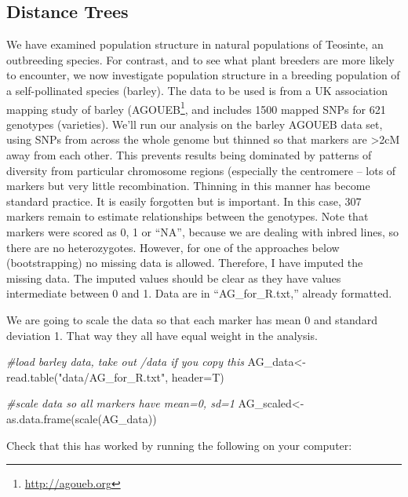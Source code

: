 \documentclass[
]{book}
\newenvironment{Shaded}{\begin{snugshade}}{\end{snugshade}}
\newcommand{\AttributeTok}[1]{\textcolor[rgb]{0.77,0.63,0.00}{#1}}
\newcommand{\CommentTok}[1]{\textcolor[rgb]{0.56,0.35,0.01}{\textit{#1}}}
\newcommand{\FunctionTok}[1]{\textcolor[rgb]{0.00,0.00,0.00}{#1}}
\newcommand{\NormalTok}[1]{#1}
\newcommand{\OtherTok}[1]{\textcolor[rgb]{0.56,0.35,0.01}{#1}}
\newcommand{\StringTok}[1]{\textcolor[rgb]{0.31,0.60,0.02}{#1}}
\renewcommand{\href}[2]{#2\footnote{\url{#1}}}
\begin{document}
\hypertarget{distance-trees}{%
\subsection{Distance Trees}\label{distance-trees}}

We have examined population structure in natural populations of Teosinte, an outbreeding species. For contrast, and to see what plant breeders are more likely to encounter, we now investigate population structure in a breeding population of a self-pollinated species (barley). The data to be used is from a UK association mapping study of barley (\href{http://agoueb.org}{AGOUEB}, and includes 1500 mapped SNPs for 621 genotypes (varieties). We'll run our analysis on the barley AGOUEB data set, using SNPs from across the whole genome but thinned so that markers are \textgreater2cM away from each other. This prevents results being dominated by patterns of diversity from particular chromosome regions (especially the centromere -- lots of markers but very little recombination. Thinning in this manner has become standard practice. It is easily forgotten but is important. In this case, 307 markers remain to estimate relationships between the genotypes. Note that markers were scored as 0, 1 or ``NA'', because we are dealing with inbred lines, so there are no heterozygotes. However, for one of the approaches below (bootstrapping) no missing data is allowed. Therefore, I have imputed the missing data. The imputed values should be clear as they have values intermediate between 0 and 1. Data are in ``AG\_for\_R.txt,'' already formatted.

We are going to scale the data so that each marker has mean 0 and standard deviation 1. That way they all have equal weight in the analysis.

\begin{Shaded}
\begin{Highlighting}[]
\CommentTok{\#load barley data, take out /data if you copy this}
\NormalTok{AG\_data}\OtherTok{\textless{}{-}}\FunctionTok{read.table}\NormalTok{(}\StringTok{"data/AG\_for\_R.txt"}\NormalTok{, }\AttributeTok{header=}\NormalTok{T)}

\CommentTok{\#scale data so all markers have mean=0, sd=1}
\NormalTok{AG\_scaled}\OtherTok{\textless{}{-}}\FunctionTok{as.data.frame}\NormalTok{(}\FunctionTok{scale}\NormalTok{(AG\_data))}
\end{Highlighting}
\end{Shaded}

Check that this has worked by running the following on your computer:
\end{document}
